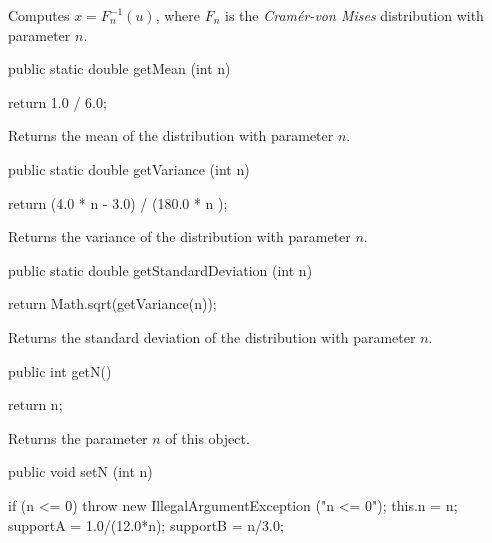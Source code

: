 \begin{tabb}
  Computes $x = F_n^{-1}(u)$, where $F_n$ is the 
  {\em Cram\'er-von Mises\/} distribution with parameter $n$.
\end{tabb}
\begin{code}

   public static double getMean (int n)\begin{hide} {
      return 1.0 / 6.0;
   }\end{hide}
\end{code}
\begin{tabb} Returns the mean of the distribution with parameter $n$.
\end{tabb}
\begin{htmlonly}
\end{htmlonly}
\begin{code}

   public static double getVariance (int n)\begin{hide} {
      return (4.0 * n - 3.0) / (180.0 * n ); 
   }\end{hide}
\end{code}
\begin{tabb} Returns the variance of the distribution with parameter $n$.
\end{tabb}
\begin{htmlonly}
\end{htmlonly}
\begin{code}

   public static double getStandardDeviation (int n)\begin{hide} {
     return Math.sqrt(getVariance(n));
   }\end{hide}
\end{code}
\begin{tabb} Returns the standard deviation of the distribution with
   parameter $n$.
\end{tabb}
\begin{htmlonly}
\end{htmlonly}
\begin{code}

   public int getN()\begin{hide} {
      return n;
   }\end{hide}
\end{code}
 \begin{tabb} Returns the parameter $n$ of this object.
 \end{tabb}
\begin{code}

   public void setN (int n)\begin{hide} {
      if (n <= 0)
         throw new IllegalArgumentException ("n <= 0");
      this.n = n;
      supportA = 1.0/(12.0*n);
      supportB = n/3.0;
   }\end{hide}
\end{code}
